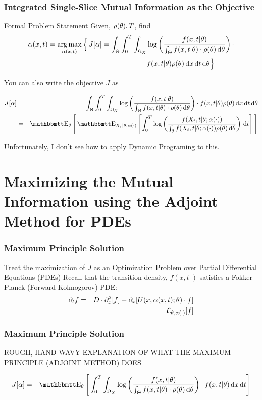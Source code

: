 \documentclass{beamer}
\begin{document}
\begin{frame}
\frametitle{Integrated Single-Slice Mutual Information as the Objective}
\begin{block}{Formal Problem Statement}
Given, $\rho({\theta}), T$, find
\begin{eqnarray*}
\a(x,t) = \argmax_{\a(x,t)} \Big\{ \, J[\a] =
\int_{\Theta}
\int_{0}^T 
\int_{\O_X}& 
\log \left( \frac{f(x,t|\th) }
				 {\int_\Theta f(x,t|\th)
\cdot \rho(\th) \intd{\th} } \right) \cdot
\\&
  f(x,t| \th) \rho(\th) 
\intd{x} \intd{t} \intd{\th}
  \Big\}
\end{eqnarray*}
\end{block}
\end{frame}

\begin{frame}
You can also write the objective $J$ as

\begin{eqnarray*}
J[\a]&  =& 
\int_{\Theta}
\int_{0}^T 
\int_{\O_X} 
\log \left( \frac{f(x,t|\th) }
				 {\int_\Theta f(x,t|\th)
\cdot \rho(\th) \intd{\th} } \right) \cdot
  f(x,t| \th) \rho(\th) 
\intd{x} \intd{t} \intd{\th}
\\
& =&  \Exp_{\th} \Bigg[
\Exp_{X_t|\th; \a(\cdot)}
\left[ \int_0^T \log\left(\frac{f(X_t,t|\th; \a(\cdot))}
{\int_\th f(X_t,t|\th; \a(\cdot)) \rho(\th)\intd{\th}}\right) \intd{t} \right]
\Bigg] 
\end{eqnarray*}

\pause
Unfortunately, I don't see how to apply Dynamic Programing to this.
\end{frame}
 
\section{Maximizing the Mutual Information using the Adjoint Method for
PDEs}
\begin{frame}
\frametitle{Maximum Principle Solution}
Treat the maximization of $J$ as an Optimization Problem over
Partial Differential Equations (PDEs)
\vskip 10pt
Recall that the transition density, $f(x,t|)$ satisfies a Fokker-Planck (Forward
Kolmogorov) PDE:
\begin{eqnarray*}
{\partial}_t f 
&=&
 D \cdot {\partial}_x^2 [f] - {\partial}_x[U(x,{\alpha}(x,t); {\theta}) \cdot f]
\\
&=& { \mathcal{L} }_{{\theta}, {\alpha}(\cdot)}[f]
\end{eqnarray*}

\end{frame} 
\begin{frame}
\frametitle{Maximum Principle Solution}
ROUGH, HAND-WAVY EXPLANATION OF WHAT THE MAXIMUM PRINCIPLE (ADJOINT METHOD) DOES

\pause
\vskip 10pt
\begin{eqnarray*}
J[\a]&  =& 
\Exp_\th \Bigg[ 
\int_{0}^T 
\int_{\O_X} 
\log \left( \frac{f(x,t|\th) }
				 {\int_\Theta f(x,t|\th)
\cdot \rho(\th) \intd{\th} } \right) \cdot
  f(x,t| \th) 
\intd{x} \intd{t} \Bigg]
\end{eqnarray*}
\end{frame} 
\end{document}

